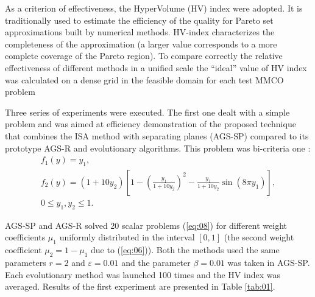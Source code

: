 \documentclass[runningheads]{llncs}
\begin{document}
As a criterion of effectiveness, the HyperVolume (HV) index \cite{Evtushenko2014,Gergel2018} were adopted. It is traditionally used to estimate the efficiency of the quality for Pareto set approximations built by numerical methods. HV-index characterizes the completeness of the approximation (a larger value corresponds to a more complete coverage of the Pareto region). To compare correctly the relative effectiveness of different methods in a unified scale the ``ideal'' value of HV index was calculated on a dense grid in the feasible domain for each test MMCO problem

Three series of experiments were executed. The first one dealt with a simple problem and was aimed at efficiency demonstration of the proposed technique that combines the ISA method with separating planes (AGS-SP) compared to its prototype AGS-R and evolutionary algorithms.
This problem was bi-criteria one \cite{CHIANDUSSI2012912}:
\begin{equation}
    \label{eq:28}
    \begin{matrix}
f_1 (y)=y_1, \\
f_2 (y)=(1+10y_2 )[1- \left(\frac{y_1}{1+10y_2} \right)^2- \frac{y_1}{1+10y_2} \sin(8 \pi y_1 ) ], \\
0 \leq y_1,y_2 \leq 1.
    \end{matrix}
\end{equation}

AGS-SP and AGS-R solved 20 scalar problems (\ref{eq:08}) for different weight coefficients $\mu_1$ uniformly distributed in the interval $[0,1]$ (the second weight coefficient $\mu_2=1-\mu_1$ due to (\ref{eq:06})). Both the methods used the same parameters $r=2$ and $\varepsilon=0.01$ and the parameter $\beta=0.01$ was taken in AGS-SP. Each evolutionary method was launched 100 times and the HV index was averaged.
Results of the first experiment are presented in Table \ref{tab:01}.
\end{document}
